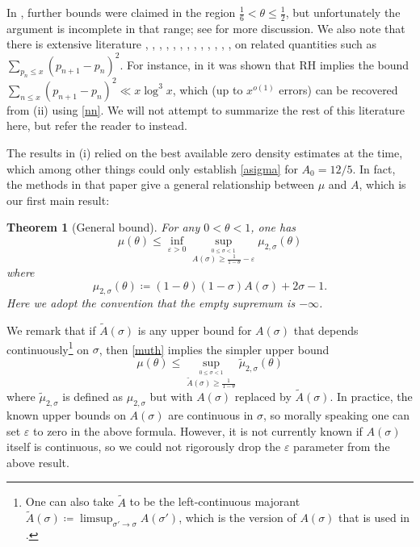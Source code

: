 \documentclass[12pt]{amsart}
\newtheorem{theorem}{Theorem}[section]
\newcommand{\eps}{\varepsilon}
\begin{document}
In \cite[Lemma 1]{baz-2}, further bounds were claimed in the region $\frac{1}{6} < \theta \leq \frac{1}{2}$, but unfortunately the argument is incomplete in that range; see  for more discussion.  We also note that there is extensive literature \cite{selberg}, \cite{wolke}, \cite{cook}, \cite{huxley}, \cite{yu}, \cite{HB-1}, \cite{HB-III}, \cite{HB-2}, \cite{ivic-2}, \cite{peck}, \cite{matomaki}, \cite{HB-3}, \cite{stadlmann}, \cite{jarviniemi} on related quantities such as $\sum_{p_n \leq x} (p_{n+1}-p_n)^2$.  For instance, in \cite{selberg} it was shown that RH implies the bound $\sum_{n \leq x} (p_{n+1}-p_n)^2 \ll x \log^3 x$, which (up to $x^{o(1)}$ errors) can be recovered from (ii) using \eqref{nn}.  We will not attempt to summarize the rest of this literature here, but refer the reader to \cite{antedb} instead.

The results in (i) relied on the best available zero density estimates at the time, which among other things could only establish \eqref{asigma} for $A_0=12/5$.  In fact, the methods in that paper give a general relationship between $\mu$ and $A$, which is our first main result:

  \begin{theorem}[General bound]\label{gen-bound}  For any $0 < \theta < 1$, one has
\begin{equation}\label{muth}
   \mu(\theta) \leq \inf_{\eps>0} \sup_{\stackrel{0 \leq \sigma < 1}{A(\sigma) \geq \frac{1}{1-\theta}-\eps}} \mu_{2,\sigma}(\theta)
\end{equation}
where
$$ \mu_{2,\sigma}(\theta) \coloneqq (1-\theta)(1-\sigma) A(\sigma) + 2\sigma - 1.$$
Here we adopt the convention that the empty supremum is $-\infty$.
\end{theorem}

We remark that if $\tilde A(\sigma)$ is any upper bound for $A(\sigma)$ that depends continuously\footnote{One can also take $\tilde A$ to be the left-continuous majorant $\tilde A(\sigma) \coloneqq \limsup_{\sigma' \to \sigma} A(\sigma')$, which is the version of $A(\sigma)$ that is used in \cite{tty}.} on $\sigma$, then \eqref{muth} implies the simpler upper bound
\begin{equation}\label{muth-simp}
   \mu(\theta) \leq \sup_{\stackrel{0 \leq \sigma < 1}{\tilde A(\sigma) \geq \frac{1}{1-\theta}}} \tilde \mu_{2,\sigma}(\theta)
\end{equation}
where $\tilde \mu_{2,\sigma}$ is defined as $\mu_{2,\sigma}$ but with $A(\sigma)$ replaced by $\tilde A(\sigma)$.  In practice, the known upper bounds on $A(\sigma)$ are continuous in $\sigma$, so morally speaking one can set $\eps$ to zero in the above formula.  However, it is not currently known if $A(\sigma)$ itself is continuous, so we could not rigorously drop the $\eps$ parameter from the above result.
\end{document}
